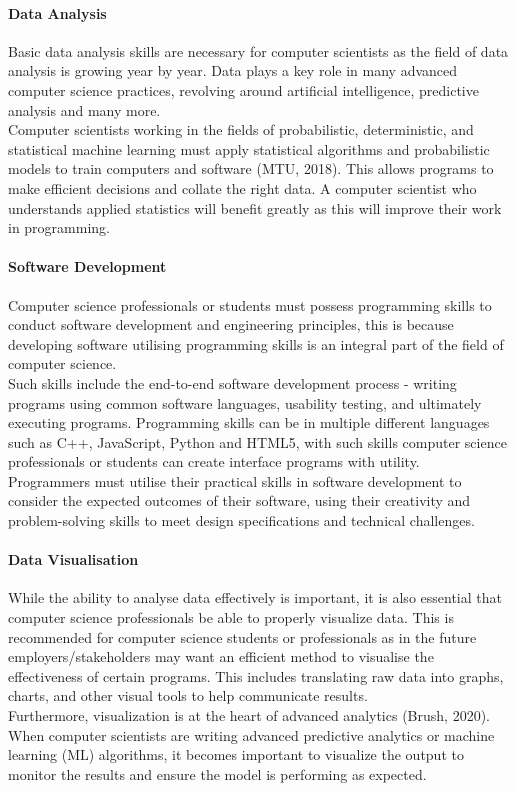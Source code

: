 \documentclass[a4paper, 11pt]{report}
\begin{document}
	\paragraph {Data Analysis} Basic data analysis skills are necessary for computer scientists as the field of data analysis is growing year by year. Data plays a key role in many advanced computer science practices, revolving around artificial intelligence, predictive analysis and many more. 
	\\Computer scientists working in the fields of probabilistic, deterministic, and statistical machine learning must apply statistical algorithms and probabilistic models to train computers and software (MTU, 2018). This allows programs to make efficient decisions and collate the right data. A computer scientist who understands applied statistics will benefit greatly as this will improve their work in programming.
	
	\paragraph {Software Development} Computer science professionals or students must possess programming skills to conduct software development and engineering principles, this is because developing software utilising programming skills is an integral part of the field of computer science.
	\\Such skills include the end-to-end software development process - writing programs using common software languages, usability testing, and ultimately executing programs. Programming skills can be in multiple different languages such as C++, JavaScript, Python and HTML5, with such skills computer science professionals or students can create interface programs with utility. 
	\\Programmers must utilise their practical skills in software development to consider the expected outcomes of their software, using their creativity and problem-solving skills to meet design specifications and technical challenges.
	
	\paragraph {Data Visualisation} While the ability to analyse data effectively is important, it is also essential that computer science professionals be able to properly visualize data. This is recommended for computer science students or professionals as in the future employers/stakeholders may want an efficient method to visualise the effectiveness of certain programs. This includes translating raw data into graphs, charts, and other visual tools to help communicate results.
	\\ Furthermore, visualization is at the heart of advanced analytics (Brush, 2020). When computer scientists are writing advanced predictive analytics or machine learning (ML) algorithms, it becomes important to visualize the output to monitor the results and ensure the model is performing as expected.
	
\end{document}
